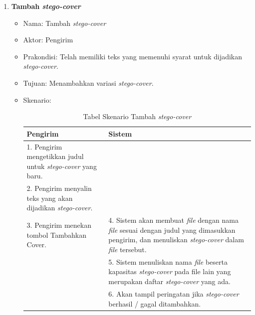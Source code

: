 \begin{enumerate}
\begin{itemize}
	\end{itemize}
	
	\item \textbf{Tambah \textit{stego-cover}}
	\begin{itemize}
		\item Nama: Tambah \textit{stego-cover}
		\item Aktor: Pengirim
		\item Prakondisi: Telah memiliki teks yang memenuhi syarat untuk dijadikan \textit{stego-cover}.
		\item Tujuan: Menambahkan variasi \textit{stego-cover}.
		\item Skenario:
		\begin{table}[H]
		\centering
		\caption{Tabel Skenario Tambah \textit{stego-cover}}
		\begin{tabular}{| p{6.5cm} | p{6.5cm} |}\hline
		Pengirim & Sistem \\
		\hline
				1. Pengirim mengetikkan judul untuk \textit{stego-cover} yang baru. & \\
				\hline
				2. Pengirim menyalin teks yang akan dijadikan \textit{stego-cover}. & \\
				\hline
				3. Pengirim menekan tombol Tambahkan Cover. & 4. Sistem akan membuat \textit{file} dengan nama \textit{file} sesuai dengan judul yang dimasukkan pengirim, dan menuliskan \textit{stego-cover} dalam \textit{file} tersebut. \\
				\hline
				& 5. Sistem menuliskan nama \textit{file} beserta kapasitas \textit{stego-cover} pada file lain yang merupakan daftar \textit{stego-cover} yang ada. \\
				\hline
				& 6. Akan tampil peringatan jika \textit{stego-cover} berhasil / gagal ditambahkan. \\
		\hline
		\end{tabular}
		\end{table}
	\end{itemize}
	

\end{enumerate}
